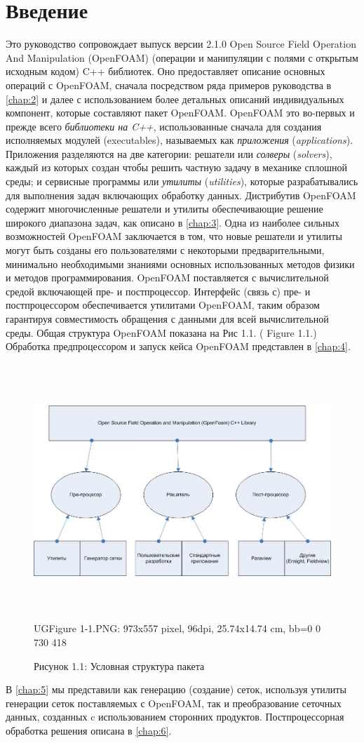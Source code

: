 \chapter{Введение}
\label{chap:1}
Это руководство сопровождает выпуск версии 2.1.0 Open Source Field Operation And Manipulation (OpenFOAM) 
(операции и манипуляции с полями с открытым исходным кодом) C++ библиотек. Оно предоставляет описание основных операций
 с OpenFOAM, сначала посредством ряда примеров руководства в \autoref{chap:2} и далее с использованием более детальных описаний 
индивидуальных компонент, которые составляют пакет OpenFOAM.
OpenFOAM это во-первых и прежде всего \textit{библиотеки на C++}, использованные сначала для создания исполняемых модулей 
(executables), называемых как \textit{приложения} (\textit{applications}). Приложения разделяются на две категории:
 решатели или \textit{солверы} (\textit{solvers}), каждый из которых создан чтобы решить частную задачу в механике сплошной
 среды; и сервисные программы или \textit{утилиты} (\textit{utilities}), которые разрабатывались для выполнения задач
 включающих обработку данных.  Дистрибутив OpenFOAM содержит многочисленные решатели и утилиты обеспечивающие
 решение широкого диапазона задач, как описано в \autoref{chap:3}.
Одна из наиболее сильных возможностей OpenFOAM заключается в том, что новые решатели и утилиты могут быть созданы его
 пользователями с некоторыми предварительными, минимально необходимыми знаниями основных использованных методов физики
 и методов программирования.
OpenFOAM поставляется с вычислительной средой включающей  пре- и постпроцессор. Интерфейс (связь с) пре- и постпроцессором
 обеспечивается утилитами OpenFOAM, таким образом гарантируя совместимость обращения с данными для всей вычислительной среды.
 Общая структура OpenFOAM показана на Рис 1.1. ( Figure 1.1.) Обработка предпроцессором и запуск кейса
OpenFOAM представлен в \autoref{chap:4}.
\begin{figure}[ht]
 \centering
 \includegraphics[width=531pt,height=273pt]{UGFigure1-1.PNG}
 UGFigure 1-1.PNG: 973x557 pixel, 96dpi, 25.74x14.74 cm, bb=0 0 730 418
 \label{fig:1.1}
 \caption{Рисунок 1.1: Условная структура пакета}
\end{figure}

 В \autoref{chap:5} мы представили как  генерацию (создание) сеток, используя  утилиты генерации сеток
 поставляемых с OpenFOAM, так и преобразование сеточных данных, созданных c использованием сторонних продуктов.
 Постпроцессорная обработка решения описана в \autoref{chap:6}.